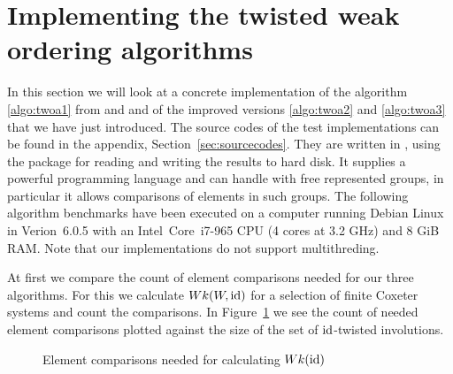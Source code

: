 \section{Implementing the twisted weak ordering algorithms}
\label{sec:implementing-twisted-involutions-algorithms}

In this section we will look at a concrete implementation of the algorithm \ref{algo:twoa1} from \cite{brennemann:twoa} and \cite{haas:twoa} and of the improved versions \ref{algo:twoa2} and \ref{algo:twoa3} that we have just introduced. The source codes of the test implementations can be found in the appendix, Section~\ref{sec:sourcecodes}. They are written in \cite{gap}, using the \cite{gap:io} package for reading and writing the results to hard disk. It supplies a powerful programming language and can handle with free represented groups, in particular it allows comparisons of elements in such groups. The following algorithm benchmarks have been executed on a computer running Debian Linux in Verion~6.0.5 with an Intel\textsuperscript{\textregistered}~Core\textsuperscript{\texttrademark}~i7-965 CPU (4 cores at 3.2 GHz) and 8 GiB RAM. Note that our implementations do not support multithreding.

At first we compare the count of element comparisons needed for our three algorithms. For this we calculate $Wk(W,\operatorname{id})$ for a selection of finite Coxeter systems and count the comparisons. In Figure~\ref{fig:twoa123-element-comparisons} we see the count of needed element comparisons plotted against the size of the set of $\operatorname{id}$-twisted involutions.

\begin{figure}[ht]
	\centering
	\caption{Element comparisons needed for calculating $Wk(\operatorname{id})$}
	\label{fig:twoa123-element-comparisons}
\end{figure}


